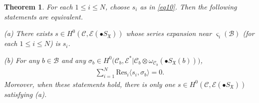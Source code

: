 \documentclass[12pt,b5paper,notitlepage]{report}
\theoremstyle{definition}
\theoremstyle{plain}
\newtheorem{thm}[df]{Theorem}
\newcommand{\fk}{\mathfrak}
\newcommand{\mc}{\mathcal}
\newcommand{\Res}{\mathrm{Res}}
\newcommand{\bk}[1]{\langle {#1}\rangle}
\newcommand{\scr}{\mathscr}
\newcommand{\sgm}{\varsigma}
\newcommand{\SX}{S_{\fk X}}
\numberwithin{equation}{section}
\begin{document}
\begin{thm}\label{lb18}
For each $1\leq i\leq N$, choose $s_i$ as in \eqref{eq10}.  Then the following statements are equivalent.

(a) There exists $s\in H^0(\mc C,\scr E(\bullet\SX))$ whose series expansion near $\sgm_i(\mc B)$ (for each $1\leq i\leq N$) is $s_i$.

(b) For any $b\in\mc B$ and any $\sigma_b\in H^0\big(\mc C_b,\scr E^*|\mc C_b\otimes\omega_{\mc C_b}(\bullet\SX(b))\big)$,
\begin{align}
\sum_{i=1}^N\Res_i\bk{s_i,\sigma_b}=0.
\end{align}
Moreover, when these statements hold, there is only one $s\in H^0(\mc C,\scr E(\bullet\SX))$ satisfying (a).
\end{thm}
\end{document}
